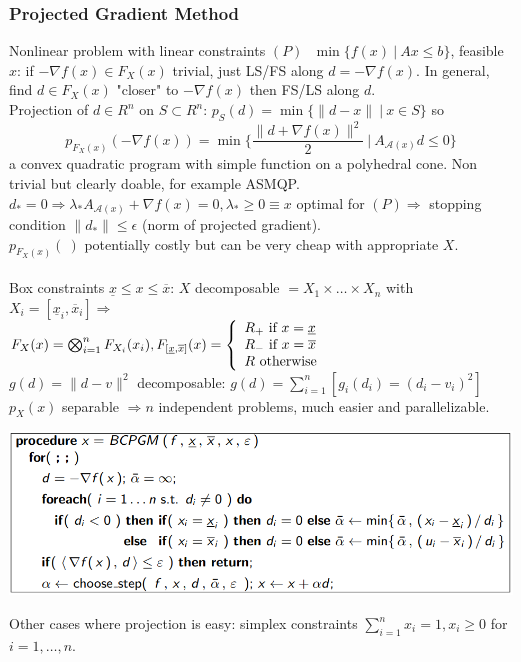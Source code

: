 \documentclass[10pt]{report}
\begin{document}
\subsubsection{Projected Gradient Method} Nonlinear problem with linear constraints $(P)\:\:\:\min\{f(x)\:|\:Ax\leq b\}$, feasible $x$: if $-\nabla f(x)\in F_X(x)$ trivial, just LS/FS along $d=-\nabla f(x)$. In general, find $d\in F_X(x)$ "closer" to $-\nabla f(x)$ then FS/LS along $d$.\\
Projection of $d\in R^n$ on $S\subset R^n$: $p_S(d)=\min\{\|d-x\|\:|\:x\in S\}$ so $$p_{F_X(x)}(-\nabla f(x))=\min\{\frac{\|d+\nabla f(x)\|^2}{2}\:|\:A_{\mathscr{A}(x)}d\leq 0\}$$
a convex quadratic program with simple function on a polyhedral cone. Non trivial but clearly doable, for example ASMQP. $d_*=0\Rightarrow \lambda_*A_{\mathscr{A}(x)}+\nabla f(x) = 0, \lambda_* \geq 0\equiv x$ optimal for $(P)\Rightarrow$ stopping condition $\|d_*\|\leq \epsilon$ (norm of projected gradient).\\
$p_{F_X(x)}(\:)$ potentially costly but can be very cheap with appropriate $X$.\\\\
Box constraints $\underline{x}\leq x\leq \overline{x}$: $X$ decomposable $= X_1\times \ldots \times X_n$ with $X_i=[\underline{x}_i, \overline{x}_i] \Rightarrow$\\$F_X(x) = \bigotimes_{i=1}^n F_{X_i}(x_i), F_{[\underline{x},\overline{x}]}(x) = \left\{\begin{array}{l}
R_+\hbox{ if }x=\underline{x}\\
R_-\hbox{ if }x=\overline{x}\\
R\hbox{ otherwise}\\
\end{array} \right.$\\
$g(d) = \|d-v\|^2$ decomposable: $g(d)=\sum_{i=1}^n [g_i(d_i)=(d_i-v_i)^2]$\\
$p_X(x)$ separable $\Rightarrow n$ independent problems, much easier and parallelizable.
\begin{center}
	\includegraphics[scale=0.75]{11.png}
\end{center}
Other cases where projection is easy: simplex constraints $\sum_{i=1}^n x_i = 1, x_i\geq 0$ for $i=1,\ldots,n$.
\end{document}
